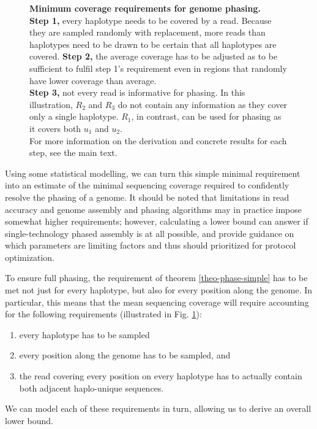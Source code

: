 \begin{figure}[t]
	\centering
	
	\caption{
	\textbf{Minimum coverage requirements for genome phasing.}\\
	\textbf{Step 1,} every haplotype needs to be covered by a read.
	Because they are sampled randomly with replacement, more reads than haplotypes need to be drawn to be certain that all haplotypes are covered.
	\textbf{Step 2,} the average coverage has to be adjusted as to be sufficient to fulfil step 1's requirement even in regions that randomly have lower coverage than average.\\
	\textbf{Step 3,} not every read is informative for phasing.
	In this illustration, $R_2$ and $R_3$ do not contain any information as they cover only a single haplotype.
	$R_1$, in contrast, can be used for phasing as it covers both $u_1$ and $u_2$.\\
	For more information on the derivation and concrete results for each step, see the main text.
	}
	\label{fig:covcalc}
\end{figure}

Using some statistical modelling, we can turn this simple minimal requirement into an estimate of the minimal sequencing coverage required to confidently resolve the phasing of a genome.
It should be noted that limitations in read accuracy and genome assembly and phasing algorithms may in practice impose somewhat higher requirements; however, calculating a lower bound can answer if single-technology phased assembly is at all possible, and provide guidance on which parameters are limiting factors and thus should prioritized for protocol optimization.

To ensure full phasing, the requirement of theorem \ref{theo-phase-simple} has to be met not just for every haplotype, but also for every position along the genome.
In particular, this means that the mean sequencing coverage will require accounting for the following requirements (illustrated in Fig. \ref{fig:covcalc}):
\begin{enumerate}
	\item every haplotype has to be sampled
	\item every position along the genome has to be sampled, and
	\item the read covering every position on every haplotype has to actually contain both adjacent haplo-unique sequences.
\end{enumerate}
We can model each of these requirements in turn, allowing us to derive an overall lower bound.

